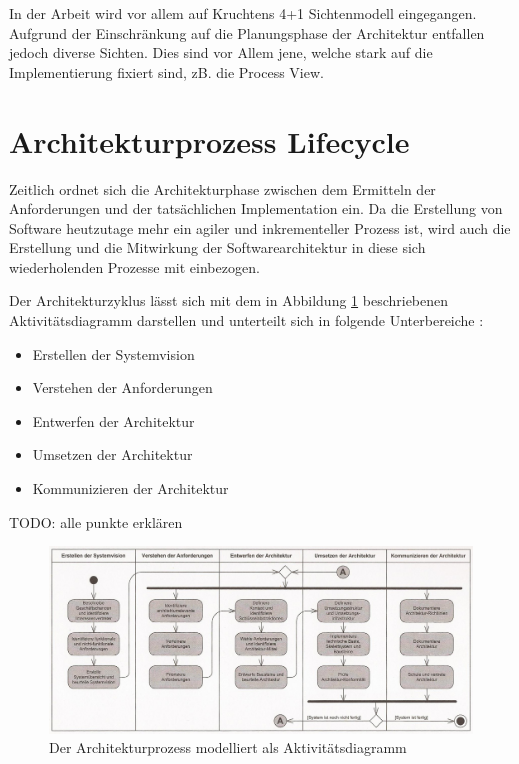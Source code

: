 In der Arbeit wird vor allem auf Kruchtens 4+1 Sichtenmodell eingegangen. Aufgrund der Einschränkung auf die Planungsphase der Architektur entfallen jedoch diverse Sichten. Dies sind vor Allem jene, welche stark auf die Implementierung fixiert sind, zB. die Process View.

\section{Architekturprozess Lifecycle}
Zeitlich ordnet sich die Architekturphase zwischen dem Ermitteln der Anforderungen und der tatsächlichen Implementation ein. Da die Erstellung von Software heutzutage mehr ein agiler und inkrementeller Prozess ist, wird auch die Erstellung und die Mitwirkung der Softwarearchitektur in diese sich wiederholenden Prozesse mit einbezogen. \cite[S. 7]{basiswissen}

Der Architekturzyklus lässt sich mit dem in Abbildung \ref{fig:cycle} beschriebenen Aktivitätsdiagramm darstellen und unterteilt sich in folgende Unterbereiche \cite[Umschlag]{softarch}:

\begin{itemize}
  \item \glqq Erstellen der Systemvision\grqq
  \item \glqq Verstehen der Anforderungen\grqq
  \item \glqq Entwerfen der Architektur\grqq
  \item \glqq Umsetzen der Architektur\grqq
  \item \glqq Kommunizieren der Architektur\grqq
\end{itemize}

TODO: alle punkte erklären

\begin{figure}[H]
    \centering
    \includegraphics[scale=0.8]{img/archcycle.png}
    \caption{Der Architekturprozess modelliert als Aktivitätsdiagramm \cite[Umschlag]{softarch}}
    \label{fig:cycle}
\end{figure}

